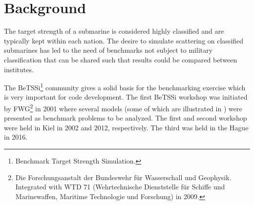 \section{Background}
The target strength of a submarine is considered highly classified and are typically kept within each nation. The desire to simulate scattering on classified submarines has led to the need of benchmarks not subject to military classification that can be shared such that results could be compared between institutes.

The BeTSSi\footnote{Benchmark Target Strength Simulation.} community gives a solid basis for the benchmarking exercise which is very important for code development. The first BeTSSi workshop was initiated by FWG\footnote{Die Forschungsanstalt der Bundeswehr f\"{u}r Wasserschall und Geophysik. Integrated with WTD 71 (Wehrtechnische Dienststelle f\"{u}r Schiffe und Marinewaffen, Maritime Technologie und Forschung) in 2009.} in 2001 where several models (some of which are illustrated in ) were presented as benchmark problems to be analyzed. The first and second workshop were held in Kiel in 2002 and 2012, respectively. The third was held in the Hague in 2016. 

